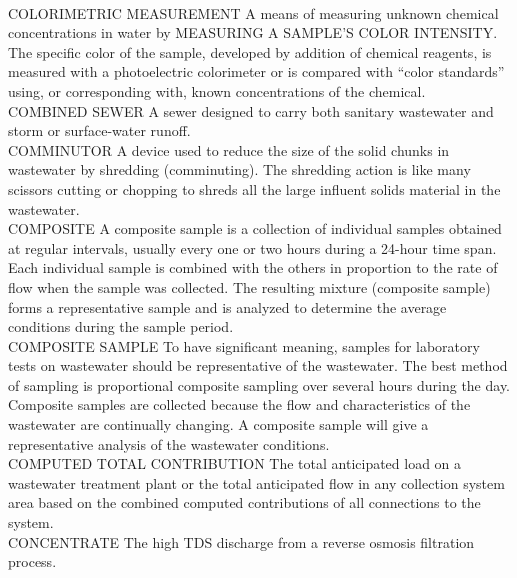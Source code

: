 \documentclass{article}
\begin{document}
\vspace{0.3cm}\\
COLORIMETRIC MEASUREMENT
A means of measuring unknown chemical concentrations in water by MEASURING A SAMPLE’S COLOR INTENSITY. The specific color of the sample, developed by addition of chemical reagents, is measured with a photoelectric colorimeter or is compared with “color standards” using, or corresponding with, known concentrations of the chemical.
\vspace{0.3cm}\\
COMBINED SEWER
A sewer designed to carry both sanitary wastewater and storm or surface-water runoff.
\vspace{0.3cm}\\
COMMINUTOR
A device used to reduce the size of the solid chunks in wastewater by shredding (comminuting). The shredding action is like many scissors cutting or chopping to shreds all the large influent solids material in the wastewater.
\vspace{0.3cm}\\
COMPOSITE
A composite sample is a collection of individual samples obtained at regular intervals, usually every one or two hours during a 24-hour time span. Each individual sample is combined with the others in proportion to the rate of flow when the sample was collected. The resulting mixture (composite sample) forms a representative sample and is analyzed to determine the average conditions during the sample period.
\vspace{0.3cm}\\
COMPOSITE SAMPLE
To have significant meaning, samples for laboratory tests on wastewater should be representative of the wastewater. The best method of sampling is proportional composite sampling over several hours during the day. Composite samples are collected because the flow and characteristics of the wastewater are continually changing. A composite sample will give a representative analysis of the wastewater conditions.
\vspace{0.3cm}\\
COMPUTED TOTAL CONTRIBUTION
The total anticipated load on a wastewater treatment plant or the total anticipated flow in any collection system area based on the combined computed contributions of all connections to the system. 
\vspace{0.3cm}\\
CONCENTRATE
The high TDS discharge from a reverse osmosis filtration process.
\vspace{0.3cm}\\
\end{document}
